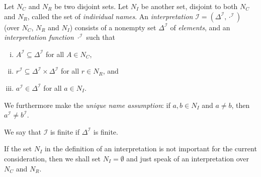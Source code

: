 \begin{Definition}[Interpretation]
  \label{def:interpretation}
  Let $N_C$ and $N_R$ be two disjoint sets.  Let $N_I$ be another set, disjoint to both
  $N_{C}$ and $N_{R}$, called the set of \emph{individual names}.  An
  \emph{interpretation} $\mathcal{I} = (\Delta^{\mathcal{I}}, \cdot^{\mathcal{I}})$ (over
  $N_C$, $N_R$ and $N_I$) consists of a nonempty set $\Delta^{\mathcal{I}}$ of
  \emph{elements}, and an \emph{interpretation function} $\cdot^{\mathcal{I}}$ such that
  \begin{enumerate}[i. ]
  \item $A^{\mathcal{I}} \subseteq \Delta^{\mathcal{I}}$ for all $A \in N_C$,
  \item $r^{\mathcal{I}} \subseteq \Delta^{\mathcal{I}} \times \Delta^{\mathcal{I}}$ for
    all $r \in N_R$, and
  \item $a^{\mathcal{I}} \in \Delta^{\mathcal{I}}$ for all $a \in N_I$.
  \end{enumerate}
  We furthermore make the \emph{unique name assumption}: if $a, b \in N_I$ and $a \neq b$,
  then $a^{\mathcal{I}} \neq b^{\mathcal{I}}$.

  We say that $\mathcal{I}$ is finite if $\Delta^{\mathcal{I}}$ is finite.
\end{Definition}

If the set $N_I$ in the definition of an interpretation is not important for the current
consideration, then we shall set $N_I = \emptyset$ and just speak of an interpretation
over $N_C$ and $N_R$.

